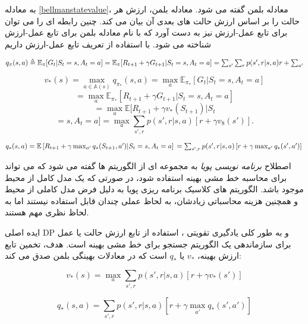 به معادله \ref{bellmanstatevalue}، معادله بلمن گفته می شود.
معادله بلمن، ارزش هر حالت را بر اساس ارزش حالت های بعدی آن بیان می کند. چنین رابطه ای را می توان برای تابع عمل-ارزش نیز به دست آورد که با نام معادله بلمن برای تابع عمل-ارزش شناخته می شود. با استفاده از تعریف تابع عمل-ارزش داریم

$q_\pi(s,a) \triangleq \mathbb{E}_\pi[G_t | S_t = s, A_t = a] \\
= \mathbb{E}_\pi[R_{t+1} + \gamma G_{t+1} | S_t = s, A_t = a] \\
= \sum_{s'} \sum_{r} p(s',r | s,a) r + \sum_{a'}
$





$$ v_*(s)= \max_{a \in \mathbb{A}(s)} q_{\pi_*}(s,a) = \max_{a} \mathbb{E}_{\pi_*} [G_t|S_t=s, A_t=a] $$
$$ = \max_{a} \mathbb{E}_{\pi_*} [R_{t+1} + \gamma G_{t+1} | S_t=s, A_t=a] $$
$$ = \max_{a} \mathbb{E} [R_{t+1} + \gamma v_*(S_{t+1}) | S_t $$
$$ = s, A_t = a] = \max_{a} \sum_{s',r} p(s',r|s,a) [r + \gamma v_8(s')].$$



$q_*(s,a) = \mathbb{E}\left[R_{t+1} + \gamma \max_{a'} q_*(S_{t+1},a')| S_t=s, A_t=a \right] \\
= \sum_{s',r} p(s',r|s,a) \left[r + \gamma \max_{a'} q_*(s',a')\right] \\
$

اصطلاح \textit{برنامه نویسی پویا}   به مجموعه ای از الگوریتم ها گفته می شود که می تواند برای محاسبه خط مشی بهینه استفاده شود، در صورتی که یک مدل کامل از محیط موجود باشد.
الگوریتم های کلاسیک برنامه ریزی پویا به دلیل فرض
مدل کاملی از محیط و همچنین هزینه محاسباتی زیادشان، به لحاظ عملی چندان قابل استفاده نیستند اما به لحاظ نظری مهم هستند.


ایده اصلی DP و به طور کلی یادگیری تقویتی ، استفاده از تابع ارزش حالت یا عمل برای سازماندهی یک الگوریتم جستجو برای خط مشی بهینه است.
هدف، تخمین تابع ارزش بهینه،
$v_*$
یا
$q_*$
است
که در معادلات بهینگی بلمن صدق می کند:


$$v_*(s)= \max_{a} \sum_{s',r} p(s',r | s,a)[r + \gamma v_*(s')]$$ \label{bellman_opt_state}

$$q_*(s,a) = \sum_{s',r} p(s',r | s,a)[r + \gamma \max_{a'} q_* (s',a')]$$
\label{bellman_opt_action}

